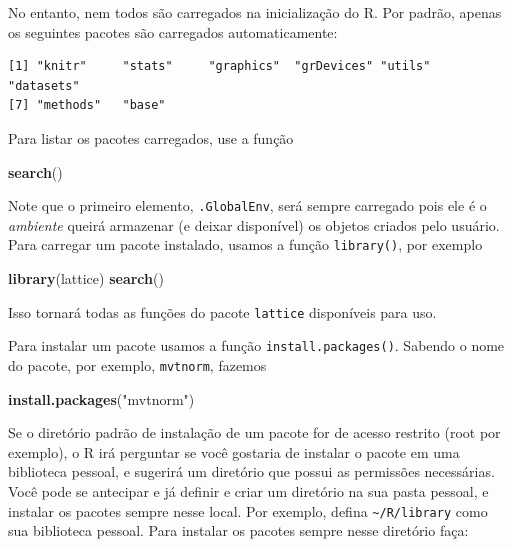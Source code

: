 \documentclass[10pt,a4paper]{book}
\newenvironment{Shaded}{\begin{snugshade}}{\end{snugshade}}
\newcommand{\KeywordTok}[1]{\textcolor[rgb]{0.13,0.29,0.53}{\textbf{#1}}}
\newcommand{\StringTok}[1]{\textcolor[rgb]{0.31,0.60,0.02}{#1}}
\newcommand{\NormalTok}[1]{#1}
\begin{document}
No entanto, nem todos são carregados na inicialização do R. Por padrão,
apenas os seguintes pacotes são carregados automaticamente:

\begin{verbatim}
[1] "knitr"     "stats"     "graphics"  "grDevices" "utils"     "datasets" 
[7] "methods"   "base"     
\end{verbatim}

Para listar os pacotes carregados, use a função

\begin{Shaded}
\begin{Highlighting}[]
\KeywordTok{search}\NormalTok{()}
\end{Highlighting}
\end{Shaded}

Note que o primeiro elemento, \texttt{.GlobalEnv}, será sempre carregado
pois ele é o \emph{ambiente} queirá armazenar (e deixar disponível) os
objetos criados pelo usuário. Para carregar um pacote instalado, usamos
a função \texttt{library()}, por exemplo

\begin{Shaded}
\begin{Highlighting}[]
\KeywordTok{library}\NormalTok{(lattice)}
\KeywordTok{search}\NormalTok{()}
\end{Highlighting}
\end{Shaded}

Isso tornará todas as funções do pacote \texttt{lattice} disponíveis
para uso.

Para instalar um pacote usamos a função \texttt{install.packages()}.
Sabendo o nome do pacote, por exemplo, \texttt{mvtnorm}, fazemos

\begin{Shaded}
\begin{Highlighting}[]
\KeywordTok{install.packages}\NormalTok{(}\StringTok{"mvtnorm"}\NormalTok{)}
\end{Highlighting}
\end{Shaded}

Se o diretório padrão de instalação de um pacote for de acesso restrito
(root por exemplo), o R irá perguntar se você gostaria de instalar o
pacote em uma biblioteca pessoal, e sugerirá um diretório que possui as
permissões necessárias. Você pode se antecipar e já definir e criar um
diretório na sua pasta pessoal, e instalar os pacotes sempre nesse
local. Por exemplo, defina \texttt{\textasciitilde{}/R/library} como sua
biblioteca pessoal. Para instalar os pacotes sempre nesse diretório
faça:
\end{document}
